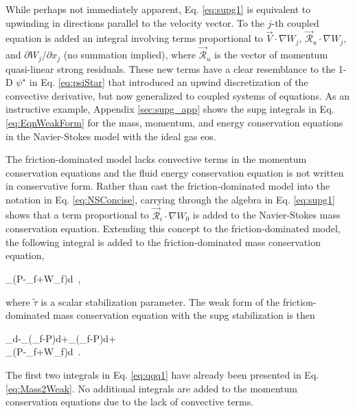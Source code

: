 While perhaps not immediately apparent, Eq. \eqref{eq:supg1} is equivalent to upwinding in directions parallel to the velocity vector. To the \(j\)-th coupled equation is added an integral involving terms proportional to \(\vec{V}\cdot\nabla W_j\), \(\vec{\mathscr{R}}_u\cdot\nabla W_j\), and \(\partial W_j/\partial x_j\) (no summation implied), where \(\vec{\mathscr{R}}_u\) is the vector of momentum quasi-linear strong residuals. These new terms have a clear resemblance to the 1-D \(\psi^\star\) in Eq. \eqref{eq:psiStar} that introduced an upwind discretization of the convective derivative, but now generalized to coupled systems of equations. As an instructive example, Appendix \ref{sec:supg_app} shows the \gls{supg} integrals in Eq. \eqref{eq:EqnWeakForm} for the mass, momentum, and energy conservation equations in the Navier-Stokes model with the ideal gas \gls{eos}.

The friction-dominated model lacks convective terms in the momentum conservation equations and the fluid energy conservation equation is not written in conservative form. Rather than cast the friction-dominated model into the notation in Eq. \eqref{eq:NSConcise}, carrying through the algebra in Eq. \eqref{eq:supg1} shows that a term proportional to \(\vec{\mathscr{R}}_i\cdot\nabla W_0\) is added to the Navier-Stokes mass conservation equation. Extending this concept to the friction-dominated model, the following integral is added to the friction-dominated mass conservation equation,

\beq
\label{eq:fd1}
\int_\Omega \tilde{\tau}\left(\epsilon\nabla P-\epsilon\rho_f+W\rho_f\right)\cdot\nabla\psi d\Omega\ ,
\eeq

\noindent where \(\tilde{\tau}\) is a scalar stabilization parameter. The weak form of the friction-dominated mass conservation equation with the \gls{supg} stabilization is then

\beqa
\label{eq:qqq1}
\int_\Omega\epsilon{}\psi d\Omega-\int_\Omega\left\lbrack{}\left(\rho_f-\nabla P\right)\right\rbrack\cdot\nabla\psi d\Omega+\int_\Gamma\left\lbrack{}\left(\rho_f-\nabla P\right)\right\rbrack \psi d\Gamma+\hspace{1cm}\\
\int_\Omega \tilde{\tau}\left(\epsilon\nabla P-\epsilon\rho_f+W\rho_f\right)\cdot\nabla\psi d\ .
\eeqa

\noindent The first two integrals in Eq. \eqref{eq:qqq1} have already been presented in Eq. \eqref{eq:Mass2Weak}. No additional integrals are added to the momentum conservation equations due to the lack of convective terms. 

